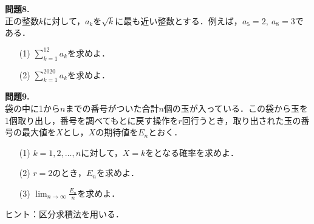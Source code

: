\documentclass[a4paper]{ltjsarticle}
\begin{document}
\noindent \textbf{問題8.}\\
正の整数$k$に対して，$a_k$を$\sqrt{k}$に最も近い整数とする．例えば，$a_5=2,~a_8=3$である．
\begin{itemize}
    \item [(1)]$\displaystyle{\sum_{k=1}^{12}a_k}$を求めよ．
    \item [(2)]$\displaystyle{\sum_{k=1}^{2020}a_k}$を求めよ．
\end{itemize}
\noindent \textbf{問題9.}\\
袋の中に1から$n$までの番号がついた合計$n$個の玉が入っている．この袋から玉を1個取り出し，番号を調べてもとに戻す操作を$r$回行うとき，取り出された玉の番号の最大値を$X$とし，$X$の期待値を$E_n$とおく．
\begin{itemize}
    \item [(1)]$k=1,2,\ldots,n$に対して，$X=k$をとなる確率を求めよ．
    \item [(2)]$r=2$のとき，$E_n$を求めよ．
    \item [(3)]$\displaystyle{\lim_{n\to\infty}\frac{E_n}{n}}$を求めよ．
\end{itemize}
ヒント：区分求積法を用いる．\\
\end{document}
